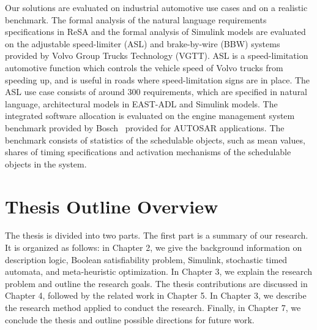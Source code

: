 Our solutions are evaluated on industrial automotive use cases and on a realistic benchmark. The formal analysis of the natural language requirements specifications in ReSA and the formal analysis of Simulink models are evaluated on the adjustable speed-limiter (ASL) and brake-by-wire (BBW) systems provided by Volvo Group Trucks Technology (VGTT). ASL is a speed-limitation automotive function which controls the vehicle speed of Volvo trucks from speeding up, and is useful in roads where speed-limitation signs are in place. The ASL use case consists of around 300 requirements, which are specified in natural language, architectural models in EAST-ADL and Simulink models. The integrated software allocation is evaluated on the engine management system benchmark provided by Bosch~\cite{} provided for AUTOSAR applications. The benchmark consists of statistics of the schedulable objects, such as mean values, shares of timing specifications and activation mechanisms of the schedulable objects in the system.

\section{Thesis Outline Overview}
The thesis is divided into two parts. The first part is a summary of our research. It is organized as follows: in Chapter 2, we give the background information on description logic, Boolean satisfiability problem, Simulink, stochastic timed automata, and meta-heuristic optimization. In Chapter 3, we explain the research problem and outline the research goals. The thesis contributions are discussed in Chapter 4, followed by the related work in Chapter 5. In Chapter 3, we describe the research method applied to conduct the research. Finally, in Chapter 7, we conclude the thesis and outline possible directions for future work.
